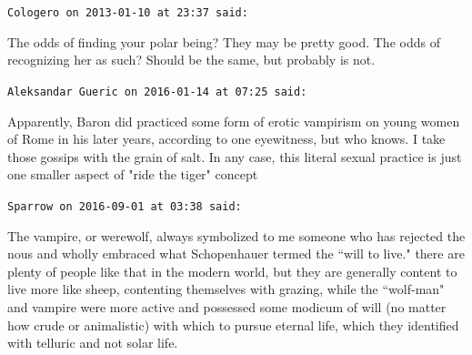 \begin{footnotesize}
\begin{sffamily}
\hfill

\texttt{Cologero on 2013-01-10 at 23:37 said: }

The odds of finding your polar being? They may be pretty good. The odds of recognizing her as such? Should be the same, but probably is not.


\hfill

\texttt{Aleksandar Gueric on 2016-01-14 at 07:25 said: }

Apparently, Baron did practiced some form of erotic vampirism on young women of Rome in his later years, according to one eyewitness, but who knows. I take those gossips with the grain of salt. In any case, this literal sexual practice is just one smaller aspect of "ride the tiger" concept


\hfill

\texttt{Sparrow on 2016-09-01 at 03:38 said: }

The vampire, or werewolf, always symbolized to me someone who has rejected the nous and wholly embraced what Schopenhauer termed the ``will to live." there are plenty of people like that in the modern world, but they are generally content to live more like sheep, contenting themselves with grazing, while the ``wolf-man" and vampire were more active and possessed some modicum of will (no matter how crude or animalistic) with which to pursue eternal life, which they identified with telluric and not solar life.


\end{sffamily}\end{footnotesize}
